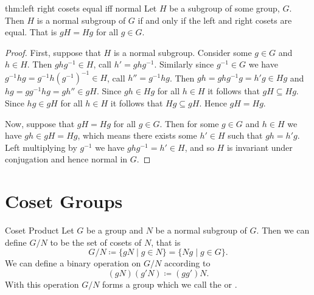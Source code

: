 \documentclass[fleqn]{NotesClass}
\begin{document}
    \begin{thm}{}{thm:left right cosets equal iff normal}
        Let \(H\) be a subgroup of some group, \(G\).
        Then \(H\) is a normal subgroup of \(G\) if and only if the left and right cosets are equal.
        That is \(gH = Hg\) for all \(g \in G\).
        
        \begin{proof}
            First, suppose that \(H\) is a normal subgroup.
            Consider some \(g \in G\) and \(h \in H\).
            Then \(ghg^{-1} \in H\), call \(h' = ghg^{-1}\).
            Similarly since \(g^{-1} \in G\) we have \(g^{-1}hg = g^{-1}h(g^{-1})^{-1} \in H\), call \(h'' = g^{-1}hg\).
            Then \(gh = ghg^{-1}g = h'g \in Hg\) and \(hg = gg^{-1}hg = gh'' \in gH\).
            Since \(gh \in Hg\) for all \(h \in H\) it follows that \(gH \subseteq Hg\).
            Since \(hg \in gH\) for all \(h \in H\) it follows that \(Hg \subseteq gH\).
            Hence \(gH = Hg\).
            
            Now, suppose that \(gH = Hg\) for all \(g \in G\).
            Then for some \(g \in G\) and \(h \in H\) we have \(gh \in gH = Hg\), which means there exists some \(h' \in H\) such that \(gh = h'g\).
            Left multiplying by \(g^{-1}\) we have \(ghg^{-1} = h' \in H\), and so \(H\) is invariant under conjugation and hence normal in \(G\).
        \end{proof}
    \end{thm}
    
    \section{Coset Groups}
    \begin{dfn}{Coset Product}{}
        Let \(G\) be a group and \(N\) be a normal subgroup of \(G\).
        Then we can define \(G/N\) to be the set of cosets of \(N\), that is
        \begin{equation}
            G/N \coloneqq \{gN \mid g \in N\} = \{Ng \mid g \in G\}.
        \end{equation}
        We can define a binary operation on \(G/N\) according to
        \begin{equation}
            (gN)(g'N) \coloneqq (gg')N.
        \end{equation}
        With this operation \(G/N\) forms a group which we call the  or .
    \end{dfn}
    
\end{document}
